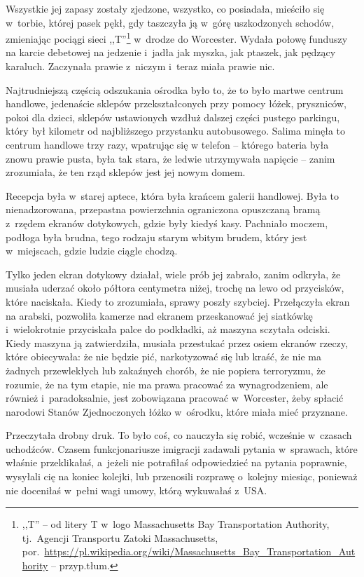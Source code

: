 \documentclass[oneside,polish,11pt,sfheadings]{mwbk}
\begin{document}
Wszystkie jej zapasy zostały zjedzone, wszystko, co posiadała, mieściło
się w~torbie, której pasek pękł, gdy taszczyła ją w~górę uszkodzonych
schodów, zmieniając pociągi sieci ,,T''\footnote{ ,,T'' -- od litery T w~logo
Massachusetts Bay Transportation Authority, tj.~Agencji
Transportu Zatoki Massachusetts,
por.~\url{https://pl.wikipedia.org/wiki/Massachusetts\_Bay\_Transportation\_Authority}
-- przyp.tłum.} w~drodze do Worcester. Wydała połowę funduszy na karcie
debetowej na jedzenie i~jadła jak myszka, jak ptaszek, jak pędzący
karaluch. Zaczynała prawie z~niczym i~teraz miała prawie nic.

Najtrudniejszą częścią odszukania ośrodka było to, że to było martwe
centrum handlowe, jedenaście sklepów przekształconych przy pomocy łóżek,
pryszniców, pokoi dla dzieci, sklepów ustawionych wzdłuż dalszej części
pustego parkingu, który był kilometr od najbliższego przystanku
autobusowego. Salima minęła to centrum handlowe trzy razy, wpatrując się
w telefon -- którego bateria była znowu prawie pusta, była tak stara, że
ledwie utrzymywała napięcie -- zanim zrozumiała, że ten rząd sklepów jest
jej nowym domem.

Recepcja była w~starej aptece, która była krańcem galerii handlowej.
Była to nienadzorowana, przepastna powierzchnia ograniczona opuszczaną
bramą z~rzędem ekranów dotykowych, gdzie były kiedyś kasy. Pachniało
moczem, podłoga była brudna, tego rodzaju starym wbitym brudem, który
jest w~miejscach, gdzie ludzie ciągle chodzą.

Tylko jeden ekran dotykowy działał, wiele prób jej zabrało, zanim
odkryła, że musiała uderzać około półtora centymetra niżej, trochę na
lewo od przycisków, które naciskała. Kiedy to zrozumiała, sprawy poszły
szybciej. Przełączyła ekran na arabski, pozwoliła kamerze nad ekranem
przeskanować jej siatkówkę i~wielokrotnie przyciskała palce do
podkładki, aż maszyna sczytała odciski. Kiedy maszyna ją zatwierdziła,
musiała przestukać przez osiem ekranów rzeczy, które obiecywała: że nie
będzie pić, narkotyzować się lub kraść, że nie ma żadnych przewlekłych
lub zakaźnych chorób, że nie popiera terroryzmu, że rozumie, że na tym
etapie, nie ma prawa pracować za wynagrodzeniem, ale również i~paradoksalnie, jest zobowiązana pracować w~Worcester, żeby spłacić
narodowi Stanów Zjednoczonych łóżko w~ośrodku, które miała mieć
przyznane.

Przeczytała drobny druk. To było coś, co nauczyła się robić, wcześnie w~czasach uchodźców. Czasem funkcjonariusze imigracji zadawali pytania w~sprawach, które właśnie przeklikałaś, a~jeżeli nie potrafiłaś
odpowiedzieć na pytania poprawnie, wysyłali cię na koniec kolejki, lub
przenosili rozprawę o~kolejny miesiąc, ponieważ nie doceniłaś w~pełni
wagi umowy, którą wykuwałaś z~USA.
\end{document}
